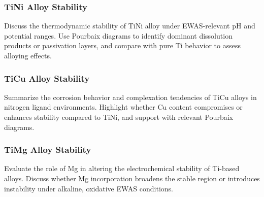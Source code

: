 \documentclass[journal=jacsat,manuscript=article]{achemso}
\begin{document}
\subsubsection{TiNi Alloy Stability}
Discuss the thermodynamic stability of TiNi alloy under EWAS-relevant pH and potential ranges. Use Pourbaix diagrams to identify dominant dissolution products or passivation layers, and compare with pure Ti behavior to assess alloying effects.

\subsubsection{TiCu Alloy Stability}
Summarize the corrosion behavior and complexation tendencies of TiCu alloys in nitrogen ligand environments. Highlight whether Cu content compromises or enhances stability compared to TiNi, and support with relevant Pourbaix diagrams.

\subsubsection{TiMg Alloy Stability}
Evaluate the role of Mg in altering the electrochemical stability of Ti-based alloys. Discuss whether Mg incorporation broadens the stable region or introduces instability under alkaline, oxidative EWAS conditions.




\end{document}
